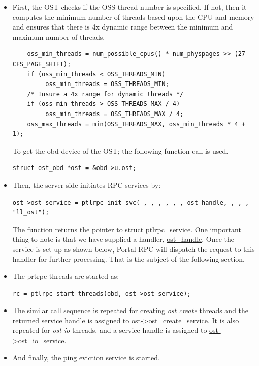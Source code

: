 \begin{itemize}

\item First, the OST checks if the OSS thread number is specified. If not, then it
computes the minimum number of threads based upon the CPU and memory and
ensures that there is 4x dynamic range between the minimum and maximum number
of threads. 
\begin{Verbatim}
    oss_min_threads = num_possible_cpus() * num_physpages >> (27 - CFS_PAGE_SHIFT);
    if (oss_min_threads < OSS_THREADS_MIN)
         oss_min_threads = OSS_THREADS_MIN;
    /* Insure a 4x range for dynamic threads */
    if (oss_min_threads > OSS_THREADS_MAX / 4)
         oss_min_threads = OSS_THREADS_MAX / 4;
    oss_max_threads = min(OSS_THREADS_MAX, oss_min_threads * 4 + 1);
\end{Verbatim}


To get the obd device of the OST; the following function call is used.

\begin{Verbatim}
struct ost_obd *ost = &obd->u.ost;
\end{Verbatim}

\item Then, the server side initiates RPC services by:
\begin{Verbatim}
ost->ost_service = ptlrpc_init_svc( , , , , , , ost_handle, , , , "ll_ost");
\end{Verbatim}

The function returns the pointer to struct \url{ptlrpc_service}. One important
thing to note is that we have supplied a handler, \url{ost_handle}.  Once the
service is set up as shown below, Portal RPC will dispatch the request to this
handler for further processing. That is the subject of the following
section.

\item The prtrpc threads are started as:

\begin{Verbatim}
rc = ptlrpc_start_threads(obd, ost->ost_service);
\end{Verbatim}

\item The similar call sequence is repeated for creating \textit{ost create}
threads and the returned service handle is assigned to
\url{ost->ost_create_service}. It is also repeated for \textit{ost io} threads,
and a service handle is assigned to \url{ost->ost_io_service}.

\item And finally, the ping eviction service is started.

\end{itemize}

